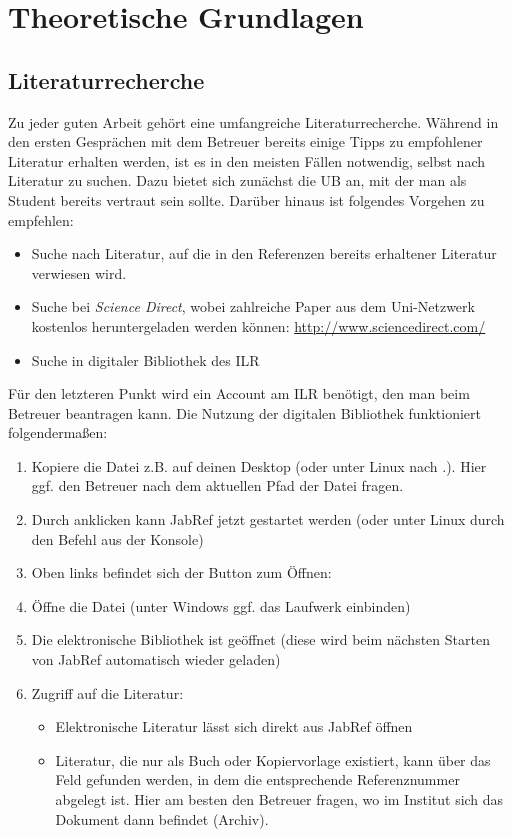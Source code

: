 \chapter{Theoretische Grundlagen}
\label{sec:grundlagen}

\section{Literaturrecherche}

Zu jeder guten Arbeit gehört eine umfangreiche Literaturrecherche. Während in den ersten Gesprächen mit dem Betreuer bereits einige Tipps zu empfohlener 
Literatur erhalten werden, ist es in den meisten Fällen notwendig, selbst nach Literatur zu suchen. Dazu bietet sich zunächst die UB an, mit der man als 
Student bereits vertraut sein sollte. Darüber hinaus ist folgendes Vorgehen zu empfehlen:
\begin{itemize}
 \item Suche nach Literatur, auf die in den Referenzen bereits erhaltener Literatur verwiesen wird.
 \item Suche bei \textit{Science Direct}, wobei zahlreiche Paper aus dem Uni-Netzwerk kostenlos heruntergeladen werden können: 
\url{http://www.sciencedirect.com/}
 \item Suche in digitaler Bibliothek des ILR
\end{itemize}
Für den letzteren Punkt wird ein Account am ILR benötigt, den man beim Betreuer beantragen kann. Die Nutzung der digitalen Bibliothek funktioniert 
folgendermaßen:
\begin{enumerate}
  \item Kopiere die Datei  z.B. auf deinen Desktop (oder unter Linux  nach .). Hier ggf. den Betreuer nach dem 
aktuellen Pfad der Datei fragen.
  \item Durch anklicken kann JabRef jetzt gestartet werden (oder unter Linux durch den Befehl  aus der Konsole)
  \item Oben links befindet sich der Button zum Öffnen: 
  \item Öffne die Datei  (unter Windows ggf. das Laufwerk  einbinden)
  \item Die elektronische Bibliothek ist geöffnet (diese wird beim nächsten Starten von JabRef automatisch wieder geladen)
  \item Zugriff auf die Literatur:
  \begin{itemize}
   \item Elektronische Literatur lässt sich direkt aus JabRef öffnen
   \item Literatur, die nur als Buch oder Kopiervorlage existiert, kann über das Feld  gefunden werden, in dem die entsprechende Referenznummer 
abgelegt ist. Hier am besten den Betreuer fragen, wo im Institut sich das Dokument dann befindet (Archiv).
  \end{itemize}
\end{enumerate}

